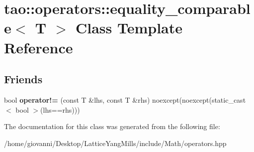 \hypertarget{classtao_1_1operators_1_1equality__comparable_3_01T_01_4}{}\section{tao\+:\+:operators\+:\+:equality\+\_\+comparable$<$ T $>$ Class Template Reference}
\label{classtao_1_1operators_1_1equality__comparable_3_01T_01_4}
\subsection*{Friends}
\begin{DoxyCompactItemize}
\item 
bool {\bfseries operator!=} (const T \&lhs, const T \&rhs) noexcept(noexcept(static\+\_\+cast$<$ bool $>$(lhs==rhs)))\hypertarget{classtao_1_1operators_1_1equality__comparable_3_01T_01_4_a107ea64a9e201404cb3341916220b760}{}\label{classtao_1_1operators_1_1equality__comparable_3_01T_01_4_a107ea64a9e201404cb3341916220b760}

\end{DoxyCompactItemize}


The documentation for this class was generated from the following file\+:\begin{DoxyCompactItemize}
\item 
/home/giovanni/\+Desktop/\+Lattice\+Yang\+Mills/include/\+Math/operators.\+hpp\end{DoxyCompactItemize}
